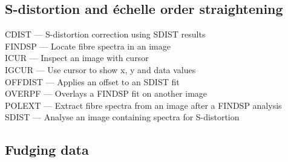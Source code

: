 \documentclass[11pt,twoside]{article}
\newcommand{\htmlref}[2]{#1}
\begin{document}

\subsection{\label{classifdistort}S-distortion and \'echelle order straightening}

\htmlref{CDIST}{CDIST} --- S-distortion correction using SDIST results\\
\htmlref{FINDSP}{FINDSP} --- Locate fibre spectra in an image\\
\htmlref{ICUR}{ICUR} --- Inspect an image with cursor\\
\htmlref{IGCUR}{IGCUR} --- Use cursor to show x, y and data values\\
\htmlref{OFFDIST}{OFFDIST} --- Applies an offset to an SDIST fit\\
\htmlref{OVERPF}{OVERPF} --- Overlays a FINDSP fit on another image\\
\htmlref{POLEXT}{POLEXT} --- Extract fibre spectra from an image after a FINDSP analysis\\
\htmlref{SDIST}{SDIST} --- Analyse an image containing spectra for S-distortion


\subsection{\label{classiffudge}Fudging data}
\end{document}
